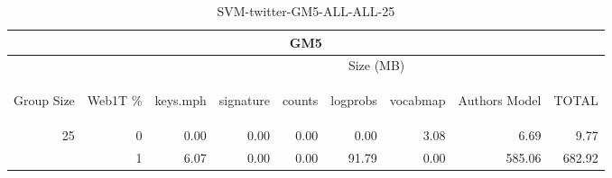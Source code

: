 \begin{center}
\begin{table}[htbp] 
 \begin{center}
\begin{tabular}{ | r | r | r | r | r | r | r | r | r |}
\hline
\multicolumn{9}{|c|}{GM5}\\
\hline
 & & \multicolumn{7}{|c|}{Size (MB)}\\ \cline{3-9}
\begin{sideways}Group Size\end{sideways} & \begin{sideways}Web1T \% \end{sideways} & \begin{sideways}keys.mph\end{sideways} & \begin{sideways}signature\end{sideways} & \begin{sideways}counts\end{sideways} & \begin{sideways}logprobs\end{sideways} & \begin{sideways}vocabmap\end{sideways} & \begin{sideways}Authors Model \end{sideways} & \begin{sideways}TOTAL\end{sideways}\\
\hline
\multirow{1}{*}{25}
 & 0 & 0.00 & 0.00 & 0.00 & 0.00 & 3.08 & 6.69 & 9.77\\ \cline{2-9}
 & 1 & 6.07 & 0.00 & 0.00 & 91.79 & 0.00 & 585.06 & 682.92\\ \cline{2-9}
\hline
\end{tabular}
\caption{SVM-twitter-GM5-ALL-ALL-25}
\label{table:SVM-twitter-GM5-ALL-ALL-25}
\end{center}
 \end{table}
\end{center}

